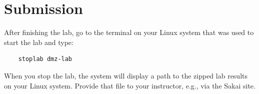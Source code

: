 \section{Submission}
After finishing the lab, go to the terminal on your Linux system that was used to start the lab and type:
\begin{verbatim}
    stoplab dmz-lab
\end{verbatim}
When you stop the lab, the system will display a path to the zipped lab results on your Linux system.  Provide that file to 
your instructor, e.g., via the Sakai site.


